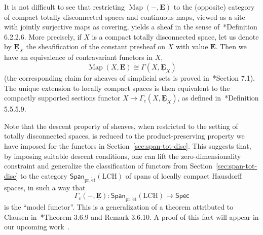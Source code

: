 \documentclass[a4paper,reqno]{amsart}
\theoremstyle{plain}
\theoremstyle{definition}
\theoremstyle{remark}
\numberwithin{equation}{section}
\newcommand{\bE}{\mathbf{E}}
\newcommand{\Spec}{\mathsf{Spec}}
\newcommand{\Span}{\mathsf{Span}}
\newcommand{\pret}{\mathrm{pr,\acute{e}t}}
\newcommand{\LCH}{\mathrm{LCH}}
\DeclareMathOperator{\Map}{Map}
\begin{document}
It is not difficult to see that restricting $\Map(-,\bE)$ to the (opposite) category of compact totally disconnected spaces and continuous maps, viewed as a site with jointly surjective maps as covering, yields a sheaf in the sense of~\cite{lur:ht}*{Definition 6.2.2.6}. More precisely, if $X$ is a compact totally disconnected space, let us denote by $\underline{\bE}_X$ the sheafification of the constant presheaf on $X$ with value $\bE$. Then we have an equivalence of contravariant functors in $X$, 
\[
\Map(X,\bE)\cong \Gamma(X,\underline{\bE}_X)
\]
(the corresponding claim for sheaves of simplicial sets is proved in~\cite{lur:ht}*{Section 7.1}).
The unique extension to locally compact spaces is then equivalent to the compactly supported sections functor $X\mapsto \Gamma_c(X,\underline{\bE}_X)$, as defined in~\cite{lur:ha}*{Definition 5.5.5.9}.

Note that the descent property of sheaves, when restricted to the setting of totally disconnected spaces, is reduced to the product-preserving property we have imposed for the functors in Section~\ref{sec:span-tot-disc}. This suggests that, by imposing suitable descent conditions, one can lift the zero-dimensionality constraint and generalize the classification of functors from Section~\ref{sec:span-tot-disc} to the category $\Span_{\pret}(\LCH)$ of spans of locally compact Hausdorff spaces, in such a way that 
\[
\Gamma_c(-, \underline{\bE})\colon \Span_{\pret}(\LCH)\to \Spec
\]
is the ``model functor''. This is a generalization of a theorem attributed to Clausen in~\cite{knp-sheaves-on-manifolds}*{Theorem 3.6.9 and Remark 3.6.10}. A proof of this fact will appear in our upcoming work~\cite{py:upcoming}.
\end{document}
